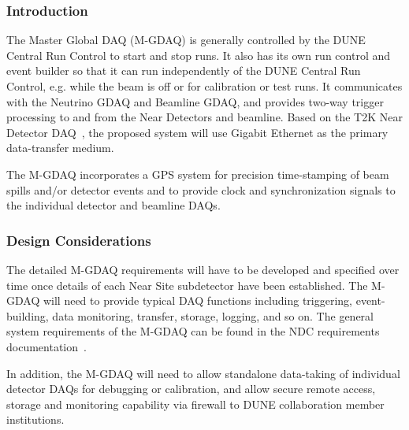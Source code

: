 \subsubsection{Introduction} %

The Master Global DAQ (M-GDAQ) is generally controlled by the DUNE 
Central Run Control to start and stop runs.
It also has its own run 
control and event builder so that it can run independently of the DUNE 
Central Run Control, e.g. while the beam is off or for calibration or 
test runs. It communicates with the Neutrino GDAQ and 
Beamline GDAQ, and provides two-way trigger processing to and from 
the Near Detectors and beamline. Based on the T2K Near Detector DAQ~\cite{ref:T2KNDDAQ},
the proposed system will use Gigabit Ethernet as the primary data-transfer 
medium.



The M-GDAQ incorporates a GPS system %
 for precision 
time-stamping of beam spills and/or detector events and to provide clock 
and synchronization signals to the individual detector and beamline 
DAQs.

\subsubsection{Design Considerations} %

The detailed M-GDAQ
requirements will have to be developed and specified 
over time once details of each Near Site subdetector have been 
established.  
The M-GDAQ will need to provide typical DAQ functions including triggering, event-building, data monitoring, transfer, storage, logging, and so on.   The general system requirements of the M-GDAQ can be found in the NDC requirements documentation~\cite{nd_requirements_doc}.

In addition, the M-GDAQ will need to allow standalone data-taking of individual detector DAQs for 
debugging or calibration, and allow secure remote access, storage and monitoring 
capability via firewall to DUNE collaboration member institutions.

